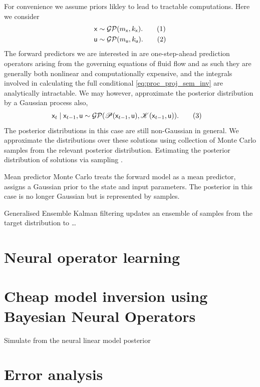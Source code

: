 \documentclass{article}
\newcommand\numberthis{\addtocounter{equation}{1}\tag{\theequation}}
\newcommand{\rv}[1]{\mathsf{#1}}
\newcommand{\dist}[1]{\mathcal{#1}}
\newcommand{\op}[1]{\mathscr{#1}}
\newcommand{\gvn}{\mid}
\newcommand{\inp}{\rv{u}}
\newcommand{\state}{\rv{x}}
\begin{document}
For convenience we assume priors likley to lead to tractable computations.
Here we consider
\begin{align*}
\state &\sim \dist{GP}(m_{\state},k_{\state}).
\numberthis \label{eq:gp_approx_state} \\
\inp &\sim \dist{GP}(m_{\inp},k_{\inp}).
\numberthis \label{eq:gp_approx_prior}
\end{align*}
The forward predictors we are interested in are one-step-ahead prediction operators arising from the governing equations of fluid flow and as such they are generally both nonlinear and computationally expensive, and the integrals involved in calculating the full conditional \eqref{eq:proc_proj_sem_inv} are analytically intractable.
We may however, approximate the posterior distribution by a Gaussian process also,
\begin{align*}
    \state_{t} \gvn \state_{t-1},\inp
&\sim \dist{GP}(\op{P}(\state_{t-1},\inp ), \op{K}(\state_{t-1},\inp )).
\numberthis \label{eq:gp_approx_proc}
\end{align*}
The posterior distributions in this case are still non-Gaussian in general.
We approximate the distributions over these solutions using collection of Monte Carlo samples from the relevant posterior distribution.
Estimating the posterior distribution of solutions via sampling \cite{EvensenData2009,TarantolaInverse2005}.

Mean predictor Monte Carlo treats the forward model as a mean predictor, assigns a Gaussian prior to the state and input parameters.
The posterior in this case is no longer Gaussian but is represented by samples.

Generalised Ensemble Kalman filtering updates an ensemble of samples from the target distribution to \dots

\section{Neural operator learning}

\section{Cheap model inversion using Bayesian Neural Operators}

Simulate from the neural linear model posterior

\section{Error analysis}
\end{document}
